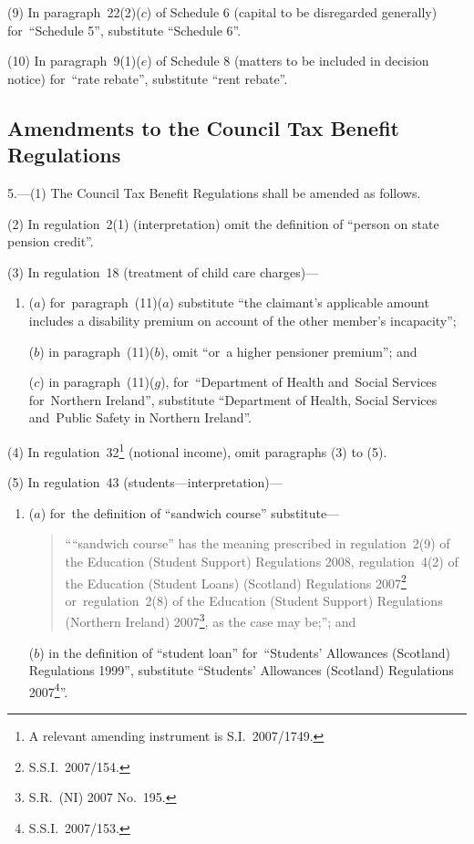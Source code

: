 \documentclass[12pt,a4paper]{article}
\begin{document}
(9) In paragraph~22(2)($c$)  of Schedule 6 (capital to be disregarded generally) for~“Schedule 5”, substitute “Schedule 6”.

(10) In paragraph~9(1)($e$)  of Schedule 8 (matters to be included in decision notice) for~“rate rebate”, substitute “rent rebate”.

\subsection[5. Amendments to the Council Tax Benefit Regulations]{Amendments to the Council Tax Benefit Regulations}

5.---(1)  The Council Tax Benefit Regulations shall be amended as follows.

(2) In regulation~2(1) (interpretation) omit the definition of “person on state pension credit”.

(3) In regulation~18 (treatment of child care charges)—
\begin{enumerate}\item[]
($a$) for~paragraph~(11)($a$)  substitute “the claimant’s applicable amount includes a disability premium on account of the other member’s incapacity”;

($b$) in paragraph~(11)($b$), omit “or~a higher pensioner premium”; and

($c$) in paragraph~(11)($g$), for~“Department of Health and~Social Services for~Northern Ireland”, substitute “Department of Health, Social Services and~Public Safety in Northern Ireland”.
\end{enumerate}

(4) In regulation~32\footnote{A relevant amending instrument is S.I.~2007/1749.} (notional income), omit paragraphs (3) to (5).

(5) In regulation~43 (students---interpretation)—
\begin{enumerate}\item[]
($a$) for~the definition of “sandwich course” substitute—
\begin{quotation}
““sandwich course” has the meaning prescribed in regulation~2(9) of the Education (Student Support) Regulations 2008, regulation~4(2) of the Education (Student Loans) (Scotland) Regulations 2007\footnote{S.S.I.~2007/154.} or~regulation~2(8) of the Education (Student Support) Regulations (Northern Ireland) 2007\footnote{S.R.~(NI) 2007 No.~195.}, as the case may be;”; and
\end{quotation}

($b$) in the definition of “student loan” for~“Students’ Allowances (Scotland) Regulations 1999”, substitute “Students’ Allowances (Scotland) Regulations 2007\footnote{S.S.I.~2007/153.}”.
\end{enumerate}
\end{document}
